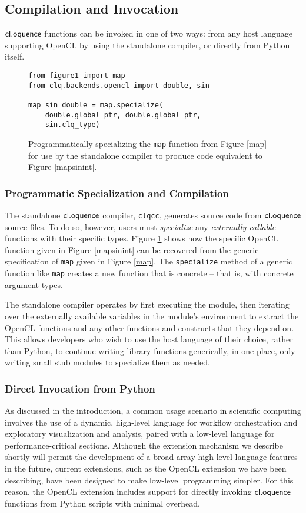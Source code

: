 \documentclass{llncs}
\begin{document}
\subsection{Compilation and Invocation}
$\textsf{cl.oquence}$ functions can be invoked in one of two ways: from any host language supporting OpenCL by using the standalone compiler, or directly from Python itself. 
\begin{figure}\small{\begin{verbatim}
from figure1 import map
from clq.backends.opencl import double, sin

map_sin_double = map.specialize(
    double.global_ptr, double.global_ptr, 
    sin.clq_type)
\end{verbatim}}
\caption{Programmatically specializing the \texttt{map} function from Figure \ref{map} for use by the standalone compiler to produce code equivalent to Figure \ref{mapsinint}.}
\label{specialization}
\end{figure}


\subsubsection{Programmatic Specialization and Compilation}
The standalone $\textsf{cl.oquence}$ compiler, \verb|clqcc|, generates source code from $\textsf{cl.oquence}$ source files. To do so, however, users must {\it specialize} any {\it externally callable} functions with their specific types. Figure \ref{specialization} shows how the specific OpenCL function given in Figure \ref{mapsinint} can be recovered from the generic specification of \verb|map| given in Figure \ref{map}. The \verb|specialize| method of a generic function like \verb|map| creates a new function that is concrete -- that is, with concrete argument types.

The standalone compiler operates by first executing the module, then iterating over the externally available variables in the module's environment to extract the OpenCL functions and any other functions and constructs that they depend on. This allows developers who wish to use the host language of their choice, rather than Python, to continue writing library functions generically, in one place, only writing small stub modules to specialize them as needed.

\subsubsection{Direct Invocation from Python}\label{direct}
As discussed in the introduction, a common usage scenario in scientific computing involves the use of a dynamic, high-level language for workflow orchestration and exploratory visualization and analysis, paired with a low-level language for performance-critical sections. Although the extension mechanism we describe shortly will permit the development of a broad array high-level language features in the future, current extensions, such as the OpenCL extension we have been describing, have been designed to make low-level programming simpler. For this reason, the OpenCL extension includes support for directly invoking $\textsf{cl.oquence}$ functions from Python scripts with minimal overhead.
\end{document}
